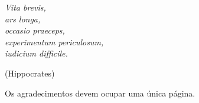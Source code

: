 \documentclass[Portugues,Final]{tese-FT}
\begin{document}
        
        
        \paginasiniciais
        
         \begin{epigrafe}
        {\it
        Vita brevis,\\
        ars longa,\\
        occasio praeceps,\\
        experimentum periculosum,\\
        iudicium difficile.}
        
        \hfill (Hippocrates)
        \end{epigrafe}
        Os agradecimentos devem ocupar uma única página.
        
\end{document}
